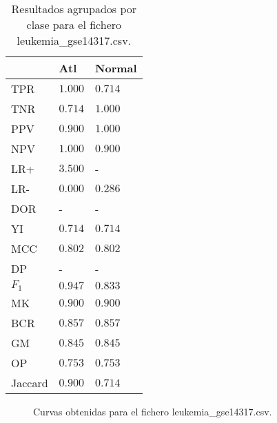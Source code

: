 \begin{table}[htp]
    \small
    \centering
    \begin{tabularx}{\columnwidth}{l Y Y}
                &  Atl                  & Normal        \\\hline
        TPR     &  $1.000$              & $0.714$       \\\hline
        TNR     &  $0.714$              & $1.000$       \\\hline
        PPV     &  $0.900$              & $1.000$       \\\hline
        NPV     &  $1.000$              & $0.900$       \\\hline
        LR+     &  $3.500$              & -             \\\hline
        LR-     &  $0.000$              & $0.286$       \\\hline
        DOR     &  -                    & -             \\\hline
        YI      &  $0.714$              & $0.714$       \\\hline
        MCC     &  $0.802$              & $0.802$       \\\hline
        DP      &  -                    & -             \\\hline
        $F_{1}$ &  $0.947$              & $0.833$       \\\hline
        MK      &  $0.900$              & $0.900$       \\\hline
        BCR     &  $0.857$              & $0.857$       \\\hline
        GM      &  $0.845$              & $0.845$       \\\hline
        OP      &  $0.753$              & $0.753$       \\\hline
        Jaccard &  $0.900$              & $0.714$       \\\hline
    \end{tabularx}
    \caption{Resultados agrupados por clase para el fichero leukemia\_gse14317.csv.}
    \label{tab:21}
\end{table}

\bigbreak

\begin{figure}[htp]
    \centering
    \caption{Curvas obtenidas para el fichero leukemia\_gse14317.csv.}
    \label{fig:15}
\end{figure}



